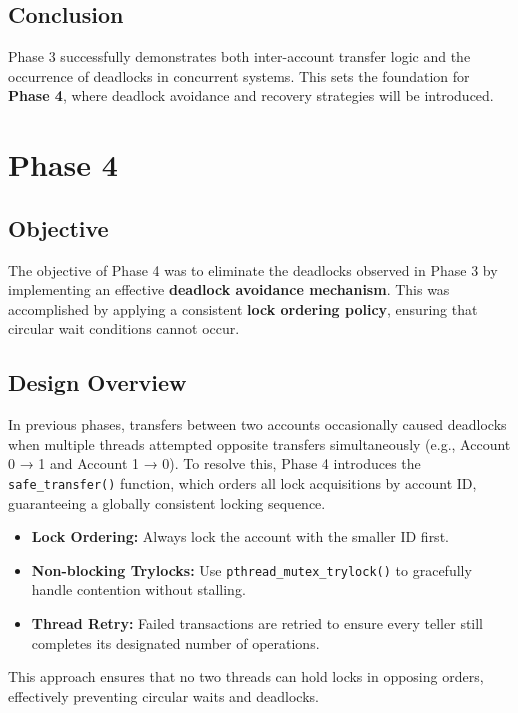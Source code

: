 \documentclass[12pt]{article}
\begin{document}
\subsection{Conclusion}
Phase 3 successfully demonstrates both inter-account transfer logic and the occurrence of deadlocks in concurrent systems.
This sets the foundation for \textbf{Phase 4}, where deadlock avoidance and recovery strategies will be introduced.


\newpage
\section{Phase 4}

\subsection{Objective}
The objective of Phase 4 was to eliminate the deadlocks observed in Phase 3 by implementing an effective \textbf{deadlock avoidance mechanism}.
This was accomplished by applying a consistent \textbf{lock ordering policy}, ensuring that circular wait conditions cannot occur.

\subsection{Design Overview}
In previous phases, transfers between two accounts occasionally caused deadlocks when multiple threads attempted opposite transfers simultaneously (e.g., Account 0 → 1 and Account 1 → 0).
To resolve this, Phase 4 introduces the \texttt{safe\_transfer()} function, which orders all lock acquisitions by account ID, guaranteeing a globally consistent locking sequence.

\begin{itemize}
  \item \textbf{Lock Ordering:} Always lock the account with the smaller ID first.
  \item \textbf{Non-blocking Trylocks:} Use \texttt{pthread\_mutex\_trylock()} to gracefully handle contention without stalling.
  \item \textbf{Thread Retry:} Failed transactions are retried to ensure every teller still completes its designated number of operations.
\end{itemize}

This approach ensures that no two threads can hold locks in opposing orders, effectively preventing circular waits and deadlocks.
\end{document}
